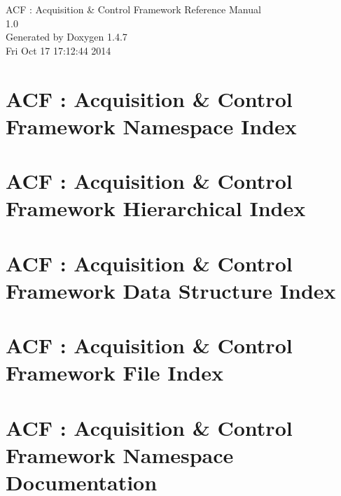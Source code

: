 \documentclass[a4paper]{book}
\begin{document}
\begin{titlepage}
\vspace*{7cm}
\begin{center}
{\Large ACF : Acquisition \& Control Framework Reference Manual\\[1ex]\large 1.0 }\\
\vspace*{1cm}
{\large Generated by Doxygen 1.4.7}\\
\vspace*{0.5cm}
{\small Fri Oct 17 17:12:44 2014}\\
\end{center}
\end{titlepage}
\clearemptydoublepage
{}
\tableofcontents
\clearemptydoublepage
{}
\chapter{ACF : Acquisition \& Control Framework Namespace Index}

\chapter{ACF : Acquisition \& Control Framework Hierarchical Index}

\chapter{ACF : Acquisition \& Control Framework Data Structure Index}

\chapter{ACF : Acquisition \& Control Framework File Index}

\chapter{ACF : Acquisition \& Control Framework Namespace Documentation}







\end{document}
